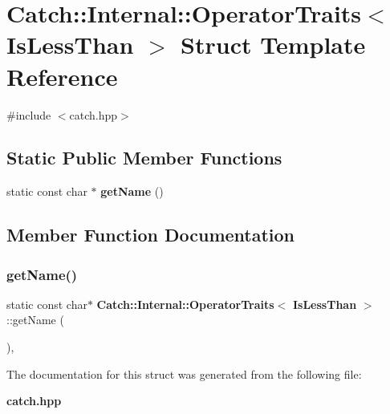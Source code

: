 \section{Catch\+:\+:Internal\+:\+:Operator\+Traits$<$ Is\+Less\+Than $>$ Struct Template Reference}
\label{struct_catch_1_1_internal_1_1_operator_traits_3_01_is_less_than_01_4}


{\ttfamily \#include $<$catch.\+hpp$>$}

\subsection*{Static Public Member Functions}
\begin{DoxyCompactItemize}
\item 
static const char $\ast$ \textbf{ get\+Name} ()
\end{DoxyCompactItemize}


\subsection{Member Function Documentation}
\mbox{\label{struct_catch_1_1_internal_1_1_operator_traits_3_01_is_less_than_01_4_aa3b536ddbd2e34b1253931ff00c32712}} 
\subsubsection{get\+Name()}
{\footnotesize\ttfamily static const char$\ast$ \textbf{ Catch\+::\+Internal\+::\+Operator\+Traits}$<$ \textbf{ Is\+Less\+Than} $>$\+::get\+Name (\begin{DoxyParamCaption}{ }\end{DoxyParamCaption})\hspace{0.3cm}{\ttfamily [inline]}, {\ttfamily [static]}}



The documentation for this struct was generated from the following file\+:\begin{DoxyCompactItemize}
\item 
\textbf{ catch.\+hpp}\end{DoxyCompactItemize}
